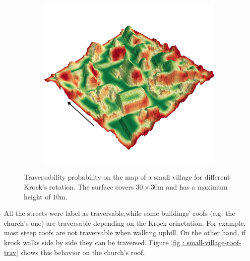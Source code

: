 \documentclass[../document.tex]{subfiles}
\begin{document}
\begin{figure} [htbp]
\begin{subfigure}[b]{0.45\textwidth}
  \end{subfigure}
  \begin{subfigure}[b]{0.45\textwidth}
      \includegraphics[width=\linewidth]{../img/4/traversability/sullens/-180.png}  
  \end{subfigure}
  \caption{Traversability probability on the map of a small village for different Krock's rotation. The surface covers $30\times 30$m and has a maximum height of $10$m.}
  \label{fig : small-village-trav}
  \end{figure}
  All the streets were label as traversable,while some buildings' roofs (e.g. the church's one) are traversable depending on the Krock orinetation. For example, most steep roofs are not traversable when walking uphill. On the other hand, if krock walks side by side they can be traversed. Figure \ref{fig : small-village-roof-trav} shows this behavior on the church's roof.
\end{document}
